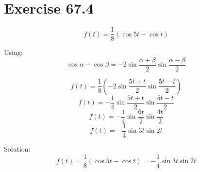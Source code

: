 \documentclass[a4paper, 10pt]{scrartcl}
\begin{document}
\section{Exercise 67.4}

\[f(t) = \frac{1}{8}(\cos{5t} - \cos{t})\]

Using:
\[\cos{\alpha} - \cos{\beta} = -2\sin{\frac{\alpha + \beta}{2}}\sin{\frac{\alpha - \beta}{2}}\]

\[f(t) = \frac{1}{8}(-2\sin{\frac{5t + t}{2}}\sin{\frac{5t - t}{2}})\]
\[f(t) = -\frac{1}{4}\sin{\frac{5t + t}{2}}\sin{\frac{5t - t}{2}}\]
\[f(t) = -\frac{1}{4}\sin{\frac{6t}{2}}\sin{\frac{4t}{2}}\]
\[f(t) = -\frac{1}{4}\sin{3t}\sin{2t}\]

Solution:
\[f(t) = \frac{1}{8}(\cos{5t} - \cos{t}) = -\frac{1}{4}\sin{3t}\sin{2t}\]
\end{document}
